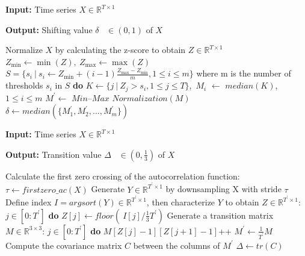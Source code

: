 \documentclass[sigconf, nonacm, pdfa]{acmart}
\begin{document}
\begin{algorithm}[t]
\caption{Calculating Shifting Values of Time Series}
\footnotesize
\begin{flushleft}
{\bf Input:} 
Time series $X\in \mathbb{R}^{T\times 1}$

{\bf Output:}
Shifting value $\delta$ ~$\in(0,1)$ of $X$
\end{flushleft}
\begin{algorithmic}[1]
\State Normalize $X$ by calculating the z-score to obtain $Z\in \mathbb{R}^{T\times 1}$
\State $Z_{\min} \leftarrow \min(Z),~Z_{\max} \leftarrow \max(Z)$
\State $S = \{s_{i}~|~s_{i} \leftarrow Z_{\min}+(i-1)\frac{Z_{\max}-Z_{\min}}{m},1\leq i\leq m\}$ where m is the number of thresholds
 $s_i$ in $S$ {\bf do}
\State \hspace{0.1in} $K \leftarrow \{j~|~ Z_j>s_{i},1\leq j\leq T\}$,~$M_i$ $\leftarrow$ $\mathit{median}(K)$,~ $1 \leq i \leq m$
\State  $M ^\prime \leftarrow$ $\mathit{Min}$--$\mathit{Max}$ $\mathit{Normalization}(M)$
 $\text{$\delta$} \leftarrow \mathit{median}(\{M_1 ^\prime, M_2^\prime, ..., M_m^\prime\})$
\end{algorithmic}
\label{alg1}
\end{algorithm}


\begin{algorithm}[t]
\caption{Calculating Transition Values of Time Series}
\footnotesize
\begin{flushleft}
{\bf Input:} 
Time series $X\in \mathbb{R}^{T\times 1}$

{\bf Output:}
Transition value $\Delta$ ~$\in(0, \frac{1}{3})$ of $X$
\end{flushleft}
\begin{algorithmic}[1]
\State Calculate the first zero crossing of the autocorrelation function: 
\Statex $\tau \leftarrow \mathit{firstzero\_ac}(X)$  
\State Generate $Y\in \mathbb{R}^{T^\prime\times 1}$ by downsampling X with stride $\tau$
\State Define index  $I = \mathit{argsort}(Y) \in \mathbb{R}^{T^\prime\times 1}$, then characterize  $Y$ to obtain $Z\in \mathbb{R}^{T^\prime\times 1}$:
 $j \in [0: T^\prime]$ {\bf do}
\State \hspace{0.1in} $Z[j] \leftarrow \mathit{floor}(~I[j] / \frac{1}{3}T^\prime)$
\State Generate a transition matrix $M\in \mathbb{R}^{3\times 3}$:
 $j \in [0: T^\prime] $ {\bf do}
\State \hspace{0.1in} $M[Z[j]-1][Z[j+1]-1]$++
\State $M^\prime \leftarrow \frac{1}{T^\prime}M$
\State Compute the covariance matrix $C$ between the columns of $M^\prime$
 $\Delta \leftarrow \mathit{tr}(C)$
\end{algorithmic}
\label{alg2}
\end{algorithm}
\end{document}
